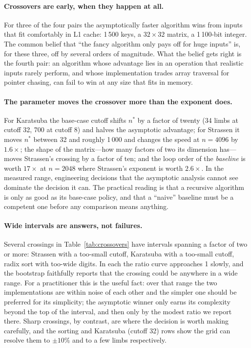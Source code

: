 \paragraph{Crossovers are early, when they happen at all.}
For three of the four pairs the asymptotically faster algorithm wins from
inputs that fit comfortably in L1 cache: 1\,500 keys, a $32\times32$ matrix,
a 1\,100-bit integer. The common belief that ``the fancy algorithm only
pays off for huge inputs'' is, for these three, off by several orders of
magnitude. What the belief gets right is the fourth pair: an algorithm whose
advantage lies in an operation that realistic inputs rarely perform, and whose
implementation trades array traversal for pointer chasing, can fail to win at
any size that fits in memory.

\paragraph{The parameter moves the crossover more than the exponent does.}
For Karatsuba the base-case cutoff shifts $n^*$ by a factor of twenty (34
limbs at cutoff 32, 700 at cutoff 8) and halves the asymptotic advantage; for
Strassen it moves $n^*$ between 32 and roughly 1\,000 and changes the speed at
$n=4096$ by $1.6\times$; the shape of the matrix---how many factors of two
its dimension has---moves Strassen's crossing by a factor of ten; and the loop
order of the \emph{baseline} is worth $17\times$ at $n=2048$ where
Strassen's exponent is worth $2.6\times$. In the measured range, engineering decisions that the
asymptotic analysis cannot see dominate the decision it can. The practical
reading is that a recursive algorithm is only as good as its base-case policy,
and that a ``naive'' baseline must be a competent one before any comparison
means anything.

\paragraph{Wide intervals are answers, not failures.}
Several crossings in Table~\ref{tab:crossovers} have intervals spanning a
factor of two or more: Strassen with a too-small cutoff, Karatsuba with a
too-small cutoff, radix sort with too-wide digits. In each the ratio curve approaches 1 slowly, and the
bootstrap faithfully reports that the crossing could be anywhere in a wide
range. For a practitioner this is the useful fact: over that range the two
implementations are within noise of each other and the simpler one should be
preferred for its simplicity; the asymptotic winner only earns its complexity
beyond the top of the interval, and then only by the modest ratio we report
there. Sharp crossings, by contrast, are where the decision is worth making
carefully, and the sorting and Karatsuba (cutoff 32) rows show the grid can
resolve them to $\pm10\%$ and to a few limbs respectively.

